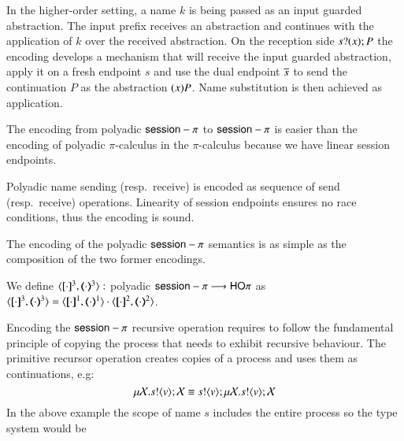 In the higher-order setting, a name $k$ is being passed as an input
guarded abstraction. The input prefix receives an abstraction and
continues with the application of $k$ over the received abstraction.
On the reception side $s ? (x) ; P$ 
the encoding develops a mechanism that will receive
the input guarded abstraction, apply it on a fresh endpoint $s$ and use
the dual endpoint $\overline{s}$ to send the continuation $P$ as the abstraction
$(x)P$. Name substitution is then achieved as application.

The encoding from polyadic $\mathsf{session}-\pi$ to $\mathsf{session}-\pi$ is easier than the
encoding of polyadic $\pi$-calculus in the $\pi$-calculus because
we have linear session endpoints.


Polyadic name sending (resp.\ receive) is encoded as sequence of
send (resp.\ receive) operations. Linearity of session endpoints
ensures no race conditions, thus the encoding is sound.

The encoding of the polyadic $\mathsf{session}-\pi$ semantics is as simple as the
composition of the two former encodings.

\begin{definition}
	We define $\encod{\cdot}{\cdot}{3}: $ polyadic $\mathsf{session}-\pi \longrightarrow \mathsf{HO}\pi$
	as $\encod{\cdot}{\cdot}{3} = \encod{\cdot}{\cdot}{1} \cat \encod{\cdot}{\cdot}{2}$.	
\end{definition}

Encoding the $\mathsf{session}-\pi$ recursive operation requires to follow the fundamental
principle of copying the process that needs to exhibit recursive behaviour.
The primitive recursor operation creates copies of a process and uses them
as continuations, e.g:
\[
	\mu \mathcal{X}. s ! \langle v \rangle ; \mathcal{X} \equiv s ! \langle v \rangle ; \mu \mathcal{X}. s ! \langle v \rangle ; \mathcal{X}
\]
In the above example the scope of name $s$ includes the entire process so
the type system would be 
